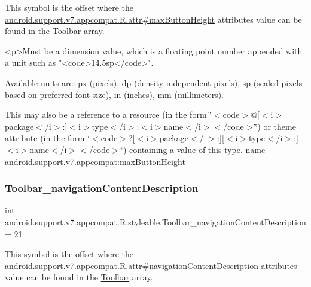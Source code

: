 This symbol is the offset where the \hyperlink{classandroid_1_1support_1_1v7_1_1appcompat_1_1R_1_1attr_a68c64276f777b020980f20b3a25352cf}{android.\+support.\+v7.\+appcompat.\+R.\+attr\#max\+Button\+Height} attribute\textquotesingle{}s value can be found in the \hyperlink{classandroid_1_1support_1_1v7_1_1appcompat_1_1R_1_1styleable_a2daba9587ef9f700f2d54cf13435cb32}{Toolbar} array.

\begin{DoxyVerb}      <p>Must be a dimension value, which is a floating point number appended with a unit such as "<code>14.5sp</code>".
\end{DoxyVerb}
 Available units are\+: px (pixels), dp (density-\/independent pixels), sp (scaled pixels based on preferred font size), in (inches), mm (millimeters). 

This may also be a reference to a resource (in the form \char`\"{}$<$code$>$@\mbox{[}$<$i$>$package$<$/i$>$\+:\mbox{]}$<$i$>$type$<$/i$>$\+:$<$i$>$name$<$/i$>$$<$/code$>$\char`\"{}) or theme attribute (in the form \char`\"{}$<$code$>$?\mbox{[}$<$i$>$package$<$/i$>$\+:\mbox{]}\mbox{[}$<$i$>$type$<$/i$>$\+:\mbox{]}$<$i$>$name$<$/i$>$$<$/code$>$\char`\"{}) containing a value of this type.  name android.\+support.\+v7.\+appcompat\+:max\+Button\+Height \mbox{\label{classandroid_1_1support_1_1v7_1_1appcompat_1_1R_1_1styleable_a61b517f99cb13ca2690103136bdab8b5}} 
\subsubsection{\texorpdfstring{Toolbar\+\_\+navigation\+Content\+Description}{Toolbar\_navigationContentDescription}}
{\footnotesize\ttfamily int android.\+support.\+v7.\+appcompat.\+R.\+styleable.\+Toolbar\+\_\+navigation\+Content\+Description = 21\hspace{0.3cm}{\ttfamily [static]}}

This symbol is the offset where the \hyperlink{classandroid_1_1support_1_1v7_1_1appcompat_1_1R_1_1attr_adbceba5aef503142f0cb67ecf32c3500}{android.\+support.\+v7.\+appcompat.\+R.\+attr\#navigation\+Content\+Description} attribute\textquotesingle{}s value can be found in the \hyperlink{classandroid_1_1support_1_1v7_1_1appcompat_1_1R_1_1styleable_a2daba9587ef9f700f2d54cf13435cb32}{Toolbar} array.

